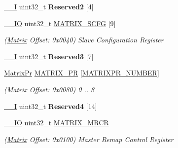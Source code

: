 \begin{DoxyCompactItemize}
\mbox{\label{structMatrix_a5787286d142e6471e7e5b3f1152092ba}} 
\mbox{\hyperlink{core__cm7_8h_af63697ed9952cc71e1225efe205f6cd3}{\+\_\+\+\_\+I}} uint32\+\_\+t {\bfseries Reserved2} \mbox{[}4\mbox{]}
\item 
\mbox{\label{structMatrix_a0c37fcbc4953e76ffa8f98efd2f1404e}} 
\mbox{\hyperlink{core__cm7_8h_aec43007d9998a0a0e01faede4133d6be}{\+\_\+\+\_\+\+IO}} uint32\+\_\+t \mbox{\hyperlink{structMatrix_a0c37fcbc4953e76ffa8f98efd2f1404e}{M\+A\+T\+R\+I\+X\+\_\+\+S\+C\+FG}} \mbox{[}9\mbox{]}
\begin{DoxyCompactList}\small\item\em (\mbox{\hyperlink{structMatrix}{Matrix}} Offset\+: 0x0040) Slave Configuration Register \end{DoxyCompactList}\item 
\mbox{\label{structMatrix_a7d2fb4f5ea7c6441265732023bd36cc6}} 
\mbox{\hyperlink{core__cm7_8h_af63697ed9952cc71e1225efe205f6cd3}{\+\_\+\+\_\+I}} uint32\+\_\+t {\bfseries Reserved3} \mbox{[}7\mbox{]}
\item 
\mbox{\label{structMatrix_a46cd8992f6c52ec91a856f9b444f6d57}} 
\mbox{\hyperlink{structMatrixPr}{Matrix\+Pr}} \mbox{\hyperlink{structMatrix_a46cd8992f6c52ec91a856f9b444f6d57}{M\+A\+T\+R\+I\+X\+\_\+\+PR}} \mbox{[}\mbox{\hyperlink{group__SAMV71__MATRIX_gafdd5910e0fa935742d5f7a0ab3dd8004}{M\+A\+T\+R\+I\+X\+P\+R\+\_\+\+N\+U\+M\+B\+ER}}\mbox{]}
\begin{DoxyCompactList}\small\item\em (\mbox{\hyperlink{structMatrix}{Matrix}} Offset\+: 0x0080) 0 .. 8 \end{DoxyCompactList}\item 
\mbox{\label{structMatrix_af53d8af7901f65357377402882e38941}} 
\mbox{\hyperlink{core__cm7_8h_af63697ed9952cc71e1225efe205f6cd3}{\+\_\+\+\_\+I}} uint32\+\_\+t {\bfseries Reserved4} \mbox{[}14\mbox{]}
\item 
\mbox{\label{structMatrix_a9ef35cfda298294505846f25e000aa2d}} 
\mbox{\hyperlink{core__cm7_8h_aec43007d9998a0a0e01faede4133d6be}{\+\_\+\+\_\+\+IO}} uint32\+\_\+t \mbox{\hyperlink{structMatrix_a9ef35cfda298294505846f25e000aa2d}{M\+A\+T\+R\+I\+X\+\_\+\+M\+R\+CR}}
\begin{DoxyCompactList}\small\item\em (\mbox{\hyperlink{structMatrix}{Matrix}} Offset\+: 0x0100) Master Remap Control Register \end{DoxyCompactList}\item 

\end{DoxyCompactItemize}
